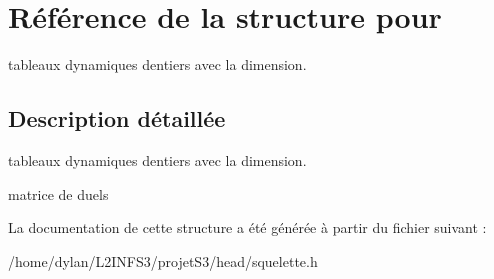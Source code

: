 \hypertarget{structpour}{}\section{Référence de la structure pour}
\label{structpour}


tableaux dynamiques d\textquotesingle{}entiers avec la dimension.  




\subsection{Description détaillée}
tableaux dynamiques d\textquotesingle{}entiers avec la dimension. 

matrice de duels 

La documentation de cette structure a été générée à partir du fichier suivant \+:\begin{DoxyCompactItemize}
\item 
/home/dylan/\+L2\+I\+N\+F\+S3/projet\+S3/head/squelette.\+h\end{DoxyCompactItemize}
